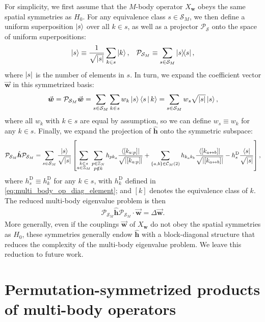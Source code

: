\documentclass[nofootinbib,notitlepage,11pt]{revtex4-2}
\renewcommand{\t}{\text} %
\newcommand{\f}[2]{\dfrac{#1}{#2}} %
\newcommand{\p}[1]{\left(#1\right)} %
\renewcommand{\sp}[1]{\left[#1\right]} %
\renewcommand{\set}[1]{\left\{#1\right\}} %
\newcommand{\bk}{\Braket} %
\renewcommand{\c}{\cdot} %
\newcommand{\m}{\bm} %
\renewcommand{\v}{\vec} %
\newcommand{\1}{\mathds{1}}
\newcommand{\C}{\mathcal{C}}
\renewcommand{\P}{\mathcal{P}}
\renewcommand{\S}{\mathcal{S}}
\newcommand{\ZZ}{\mathbb{Z}}
\newcommand{\lra}{\leftrightarrow}
\begin{document}
For simplicity, we first assume that the $M$-body operator $X_{\m w}$
obeys the same spatial symmetries as $H_0$.  For any equivalence class
$s\in\S_M$, we then define a uniform superposition $\ket{s}$ over all
$k\in s$, as well as a projector $\P_\S$ onto the space of uniform
superpositions:
\begin{align}
  \ket{s} \equiv \f1{\sqrt{\abs{s}}} \sum_{k\in s} \ket{k},
  &&
  \P_{\S_M} \equiv \sum_{s\in\S_M} \op{s},
\end{align}
where $\abs{s}$ is the number of elements in $s$.  In turn, we expand
the coefficient vector $\v{\m w}$ in this symmetrized basis:
\begin{align}
  \v{\m w} = \P_{\S_M} \v{\m w}
  = \sum_{s\in\S_M} \sum_{k\in s} w_k \ket{s} \bk{s|k}
  = \sum_{s\in\S_M} w_s \sqrt{\abs{s}} \ket{s},
\end{align}
where all $w_k$ with $k\in s$ are equal by assumption, so we can
define $w_s\equiv w_k$ for any $k\in s$.  Finally, we expand the
projection of $\hat{\m h}$ onto the symmetric subspace:
\begin{align}
  \P_{\S_M} \hat{\m h} \P_{\S_M}
  = \sum_{s\in\S_M} \f{\ket{s}}{\sqrt{\abs{s}}} \sp{
    \sum_{\substack{k\in s\\a\in\ZZ_M}}
    \sum_{\substack{p\in\ZZ_N\\p\notin k}}
    h_{p k_a} \f{\bra{\sp{k_{a:p}}}}{\sqrt{\abs{\sp{k_{a:p}}}}}
    + \sum_{\set{a,b}\in\C_M\p{2}} h_{k_ak_b}
    \f{\bra{\sp{k_{a\lra b}}}}{\sqrt{\abs{\sp{k_{a\lra b}}}}}
    - h^{\t{D}}_s \f{\bra{s}}{\sqrt{\abs{s}}}},
\end{align}
where $h^{\t{D}}_s\equiv h^{\t{D}}_k$ for any $k\in s$, with
$h^{\t{D}}_k$ defined in \eqref{eq:multi_body_op_diag_element}; and
$\sp{k}$ denotes the equivalence class of $k$.  The reduced multi-body
eigenvalue problem is then
\begin{align}
  \P_{\S_M} \hat{\m h} \P_{\S_M} \c \v{\m w} = \Delta \v{\m w}.
\end{align}
More generally, even if the couplings $\v{\m w}$ of $X_{\m w}$ do not
obey the spatial symmetries as $H_0$, these symmetries generally endow
$\hat{\m h}$ with a block-diagonal structure that reduces the
complexity of the multi-body eigenvalue problem.  We leave this
reduction to future work.  %

\section{Permutation-symmetrized products of multi-body operators}
\label{sec:operator_product}
\end{document}

